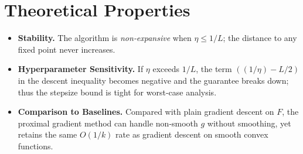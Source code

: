 \documentclass{article}
\begin{document}
\section*{Theoretical Properties}
\begin{itemize}
\item \textbf{Stability.} The algorithm is \emph{non‑expansive} when $\eta\le 1/L$; the distance to any fixed point never increases.
\item \textbf{Hyperparameter Sensitivity.} If $\eta$ exceeds $1/L$, the term $((1/\eta)-L/2)$ in the descent inequality becomes negative and the guarantee breaks down; thus the stepsize bound is tight for worst‑case analysis.
\item \textbf{Comparison to Baselines.} Compared with plain gradient descent on $F$, the proximal gradient method can handle non‑smooth $g$ without smoothing, yet retains the same $O(1/k)$ rate as gradient descent on smooth convex functions.
\end{itemize}
\end{document}
